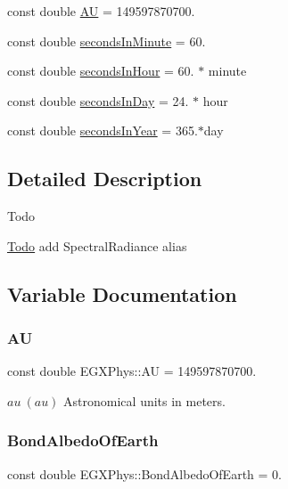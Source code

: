 \begin{DoxyCompactItemize}
\item 
const double \mbox{\hyperlink{namespace_e_g_x_phys_a999332303a2214425184fbe23dbae0c5}{AU}} = 149597870700.
\item 
const double \mbox{\hyperlink{namespace_e_g_x_phys_a65038e0b58235dc59a44cec16638df35}{seconds\+In\+Minute}} = 60.
\item 
const double \mbox{\hyperlink{namespace_e_g_x_phys_a9a6a4eb13636aa068a3f1e41cde4d6fd}{seconds\+In\+Hour}} = 60. $\ast$ minute
\item 
const double \mbox{\hyperlink{namespace_e_g_x_phys_ab4f86327f64403b843077ecc189ce52b}{seconds\+In\+Day}} = 24. $\ast$ hour
\item 
const double \mbox{\hyperlink{namespace_e_g_x_phys_aac13efe8296819409bde4a0a8691d56a}{seconds\+In\+Year}} = 365.$\ast$day
\end{DoxyCompactItemize}


\subsection{Detailed Description}
\begin{DoxyRefDesc}{Todo}
\item[\mbox{\hyperlink{todo__todo000009}{Todo}}]add Spectral\+Radiance alias \end{DoxyRefDesc}


\subsection{Variable Documentation}
\mbox{\label{namespace_e_g_x_phys_a999332303a2214425184fbe23dbae0c5}} 
\subsubsection{\texorpdfstring{AU}{AU}}
{\footnotesize\ttfamily const double E\+G\+X\+Phys\+::\+AU = 149597870700.}

$au\ (au)$ Astronomical units in meters. \mbox{\label{namespace_e_g_x_phys_a932fff28fce4321fdbf9abc5c1783dc9}} 
\subsubsection{\texorpdfstring{Bond\+Albedo\+Of\+Earth}{BondAlbedoOfEarth}}
{\footnotesize\ttfamily const double E\+G\+X\+Phys\+::\+Bond\+Albedo\+Of\+Earth = 0.}


